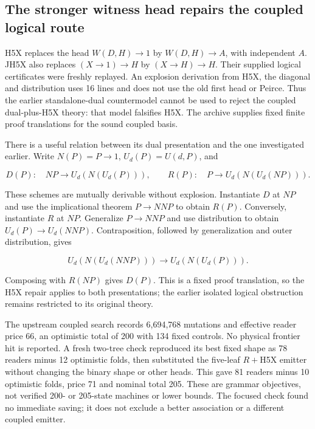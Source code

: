 \documentclass[10pt,a4paper]{article}
\begin{document}
\subsection{The stronger witness head repairs the coupled logical route}\label{the-stronger-witness-head-repairs-the-coupled-logical-route}

H5X replaces the head \(W(D,H)\to1\) by \(W(D,H)\to A\), with independent \(A\). JH5X also replaces \((X\to1)\to H\) by \((X\to H)\to H\). Their supplied logical certificates were freshly replayed. An explosion derivation from H5X, the diagonal and distribution uses 16 lines and does not use the old first head or Peirce. Thus the earlier standalone-dual countermodel cannot be used to reject the coupled dual-plus-H5X theory: that model falsifies H5X. The archive supplies fixed finite proof translations for the sound coupled basis.

There is a useful relation between its dual presentation and the one investigated earlier. Write \(N(P)=P\to1\), \(U_d(P)=U(d,P)\), and

\[
D(P):\quad NP\to U_d(N(U_d(P))),\qquad
R(P):\quad P\to U_d(N(U_d(NP))).
\]

These schemes are mutually derivable without explosion. Instantiate \(D\) at \(NP\) and use the implicational theorem \(P\to NNP\) to obtain \(R(P)\). Conversely, instantiate \(R\) at \(NP\). Generalize \(P\to NNP\) and use distribution to obtain \(U_d(P)\to U_d(NNP)\). Contraposition, followed by generalization and outer distribution, gives

\[
U_d(N(U_d(NNP)))\to U_d(N(U_d(P))).
\]

Composing with \(R(NP)\) gives \(D(P)\). This is a fixed proof translation, so the H5X repair applies to both presentations; the earlier isolated logical obstruction remains restricted to its original theory.

The upstream coupled search records 6,694,768 mutations and effective reader price 66, an optimistic total of 200 with 134 fixed controls. No physical frontier hit is reported. A fresh two-tree check reproduced its best fixed shape as 78 readers minus 12 optimistic folds, then substituted the five-leaf \(R+\)H5X emitter without changing the binary shape or other heads. This gave 81 readers minus 10 optimistic folds, price 71 and nominal total 205. These are grammar objectives, not verified 200- or 205-state machines or lower bounds. The focused check found no immediate saving; it does not exclude a better association or a different coupled emitter.
\end{document}
